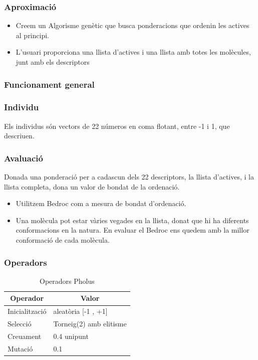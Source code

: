 \documentclass{beamer}
\begin{document}
\begin{frame}
\frametitle{Aproximació}
	\begin{itemize}
		\item Creem un Algorisme genètic que busca ponderacions que ordenin les actives al principi.
		\item L'usuari proporciona una llista d'actives i una llista amb totes les molècules, junt
			amb els descriptors
	\end{itemize}
\end{frame}

\begin{frame}
\frametitle{Funcionament general}

\end{frame}

\begin{frame}
	\frametitle{Individu}
	Els individus són vectors de 22 números en coma flotant, entre -1 i 1, que descriuen.
\end{frame}

\begin{frame}
	\frametitle{Avaluació}
	\begin{block}{}
		Donada una ponderació per a cadascun dels 22 descriptors, la llista d'actives, i la llista
		completa, dona un valor de bondat de la ordenació.
	\end{block}
	\pause
	\begin{itemize}
		\item Utilitzem Bedroc com a mesura de bondat d'ordenació.
		\item Una molècula pot estar vàries vegades en la llista, donat que hi ha diferents
			conformacions en la natura.  En evaluar el Bedroc ens quedem amb la millor conformació
			de cada molècula.
	\end{itemize}
\end{frame}


\begin{frame}
\frametitle{Operadors}


\begin{table}
\centering
\begin{tabular}{|l|l|}
\hline
\multicolumn{1}{|c|}{\textbf{Operador }} & \multicolumn{1}{c|}{\textbf{ Valor}} \\
\hline
\hline
Inicialització & aleatòria [-1 , +1] \\
Selecció       & Torneig(2) amb elitisme  \\
Creuament       & 0.4  unipunt        \\
Mutació        &   0.1                  \\
\hline
\end{tabular}
\caption{Operadors Pholus}
\end{table}

\end{frame}
\end{document}
